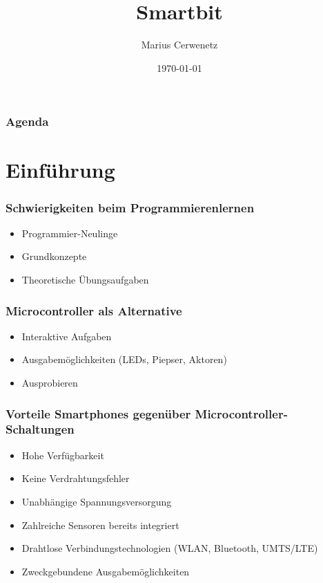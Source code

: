 \documentclass{beamer}
\title{Smartbit}
\author{Marius Cerwenetz}
\institute{Institut für Softwaretechnik und Datenkommunikation}
\date{\today}
\begin{document}
\frame{\titlepage}
\begin{frame}
\frametitle{Agenda}
\tableofcontents

\end{frame}

\section{Einführung}
\begin{frame}
    \frametitle{Schwierigkeiten beim Programmierenlernen}
    \begin{itemize}
        \item Programmier-Neulinge
        \item Grundkonzepte
        \item Theoretische Übungsaufgaben
    \end{itemize}
\end{frame}

\begin{frame}
    \frametitle{Microcontroller als Alternative}
    \begin{itemize}
        \item Interaktive Aufgaben
        \item Ausgabemöglichkeiten (LEDs, Piepser, Aktoren)
        \item Ausprobieren
    \end{itemize}
\end{frame}



\begin{frame}
    \frametitle{Vorteile Smartphones gegenüber Microcontroller-Schaltungen}
    \begin{itemize}
        \item Hohe Verfügbarkeit
        \item Keine Verdrahtungsfehler
        \item Unabhängige Spannungsversorgung
        \item Zahlreiche Sensoren bereits integriert
        \item Drahtlose Verbindungstechnologien (WLAN, Bluetooth, UMTS/LTE)
        \item Zweckgebundene Ausgabemöglichkeiten
    \end{itemize}
\end{frame}
\end{document}

